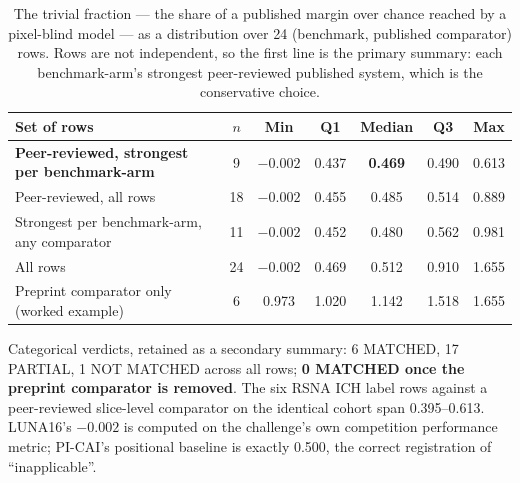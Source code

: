 \documentclass[11pt,a4paper]{article}
\begin{document}
\begin{table}[htbp]
\centering
\caption{The trivial fraction --- the share of a published margin over chance
reached by a pixel-blind model --- as a distribution over 24 (benchmark,
published comparator) rows. Rows are not independent, so the first line is the
primary summary: each benchmark-arm's strongest peer-reviewed published system,
which is the conservative choice.}
\label{tab:fraction}
\small
\begin{tabular}{lcccccc}
\toprule
Set of rows & $n$ & Min & Q1 & Median & Q3 & Max\\
\midrule
\textbf{Peer-reviewed, strongest per benchmark-arm} & 9 & $-0.002$ & 0.437 & \textbf{0.469} & 0.490 & 0.613\\
Peer-reviewed, all rows & 18 & $-0.002$ & 0.455 & 0.485 & 0.514 & 0.889\\
Strongest per benchmark-arm, any comparator & 11 & $-0.002$ & 0.452 & 0.480 & 0.562 & 0.981\\
All rows & 24 & $-0.002$ & 0.469 & 0.512 & 0.910 & 1.655\\
Preprint comparator only (worked example) & 6 & 0.973 & 1.020 & 1.142 & 1.518 & 1.655\\
\bottomrule
\end{tabular}

\vspace{0.3em}
\footnotesize
Categorical verdicts, retained as a secondary summary: 6 MATCHED, 17 PARTIAL, 1
NOT MATCHED across all rows; \textbf{0 MATCHED once the preprint comparator is
removed}. The six RSNA ICH label rows against a peer-reviewed slice-level
comparator on the identical cohort span 0.395--0.613. LUNA16's $-0.002$ is
computed on the challenge's own competition performance metric; PI-CAI's
positional baseline is exactly 0.500, the correct registration of
``inapplicable''.
\end{table}
\end{document}
